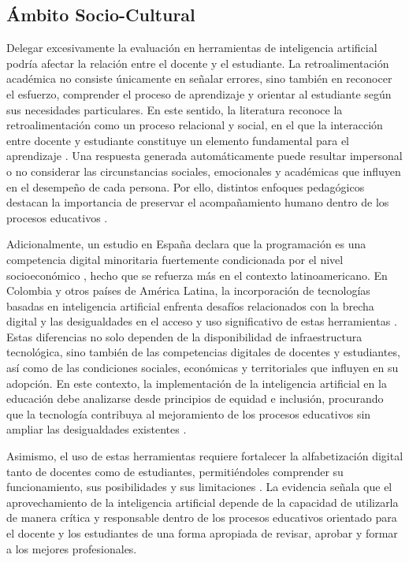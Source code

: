 \documentclass[letterpaper, 10 pt, conference]{ieeeconf}
\begin{document}
\subsection{Ámbito Socio-Cultural} 

Delegar excesivamente la evaluación en herramientas de inteligencia artificial podría afectar la relación entre el docente y el estudiante. La retroalimentación académica no consiste únicamente en señalar errores, sino también en reconocer el esfuerzo, comprender el proceso de aprendizaje y orientar al estudiante según sus necesidades particulares. En este sentido, la literatura reconoce la retroalimentación como un proceso relacional y social, en el que la interacción entre docente y estudiante constituye un elemento fundamental para el aprendizaje \cite{5}. Una respuesta generada automáticamente puede resultar impersonal o no considerar las circunstancias sociales, emocionales y académicas que influyen en el desempeño de cada persona. Por ello, distintos enfoques pedagógicos destacan la importancia de preservar el acompañamiento humano dentro de los procesos educativos \cite{14}. 

Adicionalmente, un estudio en España declara que la programación es una competencia digital minoritaria fuertemente condicionada por el nivel socioeconómico \cite{20}, hecho que se refuerza más en el contexto latinoamericano. En Colombia y otros países de América Latina, la incorporación de tecnologías basadas en inteligencia artificial enfrenta desafíos relacionados con la brecha digital y las desigualdades en el acceso y uso significativo de estas herramientas \cite{17}. Estas diferencias no solo dependen de la disponibilidad de infraestructura tecnológica, sino también de las competencias digitales de docentes y estudiantes, así como de las condiciones sociales, económicas y territoriales que influyen en su adopción. En este contexto, la implementación de la inteligencia artificial en la educación debe analizarse desde principios de equidad e inclusión, procurando que la tecnología contribuya al mejoramiento de los procesos educativos sin ampliar las desigualdades existentes \cite{16}.

Asimismo, el uso de estas herramientas requiere fortalecer la alfabetización digital tanto de docentes como de estudiantes, permitiéndoles comprender su funcionamiento, sus posibilidades y sus limitaciones \cite{17}. La evidencia señala que el aprovechamiento de la inteligencia artificial depende de la capacidad de utilizarla de manera crítica y responsable dentro de los procesos educativos orientado para el docente y los estudiantes de una forma apropiada de revisar, aprobar y formar a los mejores profesionales. 
\end{document}
